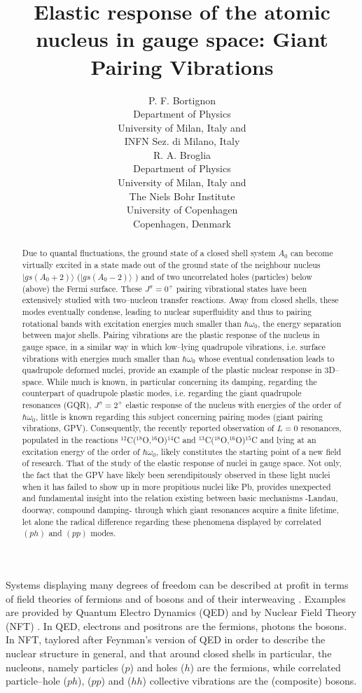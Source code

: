\documentclass[a4paper,11pt]{article}
\title{Elastic response of the atomic nucleus in gauge space: Giant Pairing Vibrations}
\author{P. F. Bortignon\\Department of Physics\\University of Milan, Italy and\\ INFN Sez. di Milano, Italy\\R. A. Broglia\\ Department of Physics\\University of Milan, Italy and\\ The Niels Bohr Institute\\ University of Copenhagen
\\Copenhagen, Denmark}
\numberwithin{equation}{section}
\numberwithin{figure}{section}
\numberwithin{table}{section}
\newcommand{\ket}[1]{|{#1} \rangle }
\begin{document}
\maketitle
\begin{abstract}
Due to quantal fluctuations, the ground state of a closed shell system $A_0$ can become virtually excited in a state made out of the ground state of the neighbour nucleus $\ket{gs(A_0+2)}$ ($\ket{gs(A_0-2)}$ ) and of two uncorrelated holes (particles) below (above) the Fermi surface.  These $J^\pi=0^+$ pairing vibrational states have been extensively studied with  two--nucleon transfer reactions. Away from  closed shells, these modes  eventually  condense, leading to nuclear superfluidity and thus to pairing rotational bands with excitation energies much smaller than  $\hbar\omega_0$, the energy separation between major shells. Pairing vibrations are the plastic response of the nucleus in gauge space, in a similar way in which low--lying quadrupole vibrations, i.e. surface vibrations with energies much smaller than $\hbar\omega_0$ whose eventual condensation leads to quadrupole deformed nuclei, provide an example of the plastic nuclear response in 3D--space.
While much is known, in particular concerning its damping, regarding the counterpart of quadrupole plastic  modes, i.e. regarding the giant quadrupole resonances (GQR), $J^\pi=2^+$ elastic response of the nucleus  with energies of the order of $\hbar\omega_0$, little is known regarding this subject concerning pairing modes (giant pairing vibrations, GPV). Consequently, the recently reported observation of $L=0$ resonances, populated in the reactions $^{12}$C($^{18}$O,$^{16}$O)$^{14}$C  and $^{13}$C($^{18}$O,$^{16}$O)$^{15}$C  and lying at an excitation energy of the order of $\hbar\omega_0$, likely constitutes the starting point of a new field of  research. That of the study of the elastic response of nuclei in gauge space. Not only, the fact that the GPV have likely been serendipitously observed in these light nuclei when it has failed to show up in more propitious nuclei like Pb, provides unexpected and fundamental insight into the relation existing between basic mechanisms -Landau, doorway, compound damping- through which giant resonances acquire a finite lifetime, let alone the radical difference regarding these phenomena displayed by correlated $(ph)$ and $(pp)$ modes.
\end{abstract}
Systems displaying many degrees of freedom can be described at profit in terms of field theories of fermions and of bosons and of their interweaving \cite{Weinberg:96,Weinberg:96b}. Examples are provided by Quantum Electro Dynamics (QED) \cite{Feynman:61} and by Nuclear Field Theory (NFT) \cite{Bes:74,Bortignon:77}. In QED, electrons and positrons are the fermions, photons the bosons. In NFT, taylored after Feynman's version of QED in order to describe the nuclear structure in general, and  that around closed shells in particular, the nucleons, namely particles ($p$) and holes ($h$) are the fermions, while correlated particle--hole ($ph$), ($pp$) and ($hh$) collective vibrations are the (composite) bosons.
\end{document}
